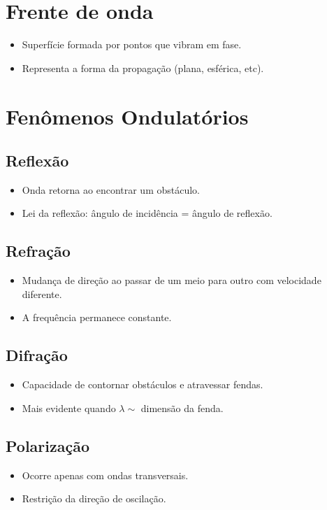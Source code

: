 \documentclass[a4paper,12pt]{article}
\begin{document}
\begin{multicols}{2}
\section{Frente de onda}
\begin{itemize}
    \item Superfície formada por pontos que vibram em fase.
    \item Representa a forma da propagação (plana, esférica, etc).
\end{itemize}

\section{Fenômenos Ondulatórios}
\subsection{Reflexão}
\begin{itemize}
    \item Onda retorna ao encontrar um obstáculo.
    \item Lei da reflexão: ângulo de incidência = ângulo de reflexão.
\end{itemize}

\subsection{Refração}
\begin{itemize}
    \item Mudança de direção ao passar de um meio para outro com velocidade diferente.
    \item A frequência permanece constante.
\end{itemize}

\subsection{Difração}
\begin{itemize}
    \item Capacidade de contornar obstáculos e atravessar fendas.
    \item Mais evidente quando $\lambda \sim$ dimensão da fenda.
\end{itemize}

\subsection{Polarização}
\begin{itemize}
    \item Ocorre apenas com ondas transversais.
    \item Restrição da direção de oscilação.
\end{itemize}


\end{multicols}
\end{document}
